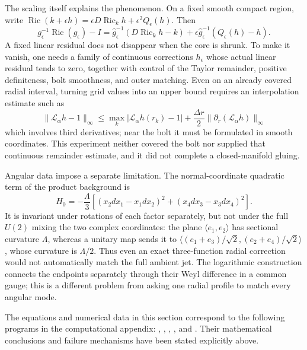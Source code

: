 \documentclass[a4paper,11pt]{article}
\numberwithin{equation}{section}
\theoremstyle{definition}
\newcommand{\Ric}{\operatorname{Ric}}
\begin{document}
The scaling itself explains the phenomenon. On a fixed smooth compact region, write
$\Ric(k+\epsilon h)=\epsilon D\Ric_kh+\epsilon^2Q_\epsilon(h)$. Then
\begin{equation}\label{eq:eh-ls-linear-floor}
g_\epsilon^{-1}\Ric(g_\epsilon)-I
=\widehat g_\epsilon^{-1}(D\Ric_kh-k)
+\epsilon\widehat g_\epsilon^{-1}(Q_\epsilon(h)-h).
\end{equation}
A fixed linear residual does not disappear when the core is shrunk. To make it vanish, one needs a family of continuous corrections
$h_\epsilon$ whose actual linear residual tends to zero, together with control of the Taylor remainder, positive definiteness, bolt smoothness, and outer matching.
Even on an already covered radial interval, turning grid values into an upper bound requires an interpolation estimate such as
\[
\|\mathscr L_\alpha h-1\|_\infty
\le\max_k|\mathscr L_\alpha h(r_k)-1|
+\frac{\Delta r}{2}\|\partial_r(\mathscr L_\alpha h)\|_\infty
\]
which involves third derivatives; near the bolt it must be formulated in smooth coordinates.
This experiment neither covered the bolt nor supplied that continuous remainder estimate, and it did not complete a closed-manifold gluing.

Angular data impose a separate limitation. The normal-coordinate quadratic term of the product background is
\begin{equation}\label{eq:product-quadratic-jet}
H_0=-\frac\Lambda3\left[
(x_2dx_1-x_1dx_2)^2+(x_4dx_3-x_3dx_4)^2\right].
\end{equation}
It is invariant under rotations of each factor separately, but not under the full $U(2)$ mixing the two complex coordinates:
the plane $\langle e_1,e_2\rangle$ has sectional curvature $\Lambda$,
whereas a unitary map sends it to
$\langle(e_1+e_3)/\sqrt2,(e_2+e_4)/\sqrt2\rangle$, whose curvature is $\Lambda/2$.
Thus even an exact three-function radial correction would not automatically match the full ambient jet.
The logarithmic construction connects the endpoints separately through their Weyl difference in a common gauge; this is a different problem from asking one radial profile to match every angular mode.

The equations and numerical data in this section correspond to the following programs in the computational appendix:
, ,
, ,
and . Their mathematical conclusions and failure mechanisms have been stated explicitly above.
\end{document}

